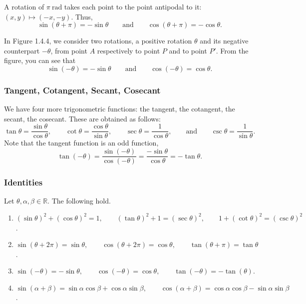 \documentclass[11pt]{book}
\theoremstyle{break}
\theoremstyle{no_label}
\newcommand{\bbR}{\mathbb{R}}
\numberwithin{equation}{section}
\begin{document}
\vspace*{1.5em}

A rotation of $\pi\ \text{rad}$ takes each point to the point antipodal to it: $(x, y)\mapsto(-x, -y)$. Thus, $$\sin(\theta+\pi)=-\sin\theta\qquad\text{and}\qquad\cos(\theta+\pi)=-\cos\theta.$$

In Figure 1.4.4, we consider two rotations, a positive rotation $\theta$ and its negative counterpart $-\theta$, from point $A$ respectively to point $P$ and to point $P'$. From the figure, you can see that $$\sin(-\theta)=-\sin\theta\qquad\text{and}\qquad\cos(-\theta)=\cos\theta.$$

\subsubsection*{Tangent, Cotangent, Secant, Cosecant}

We have four more trigonometric functions: the tangent, the cotangent, the secant, the cosecant. These are obtained as follows: $$\tan\theta=\dfrac{\sin\theta}{\cos\theta},\qquad\cot\theta=\dfrac{\cos\theta}{\sin\theta},\qquad\sec\theta=\dfrac{1}{\cos\theta},\qquad\text{and}\qquad\csc\theta=\dfrac{1}{\sin\theta}.$$ Note that the tangent function is an odd function, $$\tan(-\theta)=\dfrac{\sin(-\theta)}{\cos(-\theta)}=\dfrac{-\sin\theta}{\cos\theta}=-\tan\theta.$$

\subsubsection*{Identities}

\begin{theorem}
    Let $\theta, \alpha, \beta\in\bbR$. The following hold.
    \begin{enumerate}
        \item $(\sin\theta)^2+(\cos\theta)^2=1, \qquad (\tan\theta)^2+1=(\sec\theta)^2,\qquad 1+(\cot\theta)^2=(\csc\theta)^2$.
        \item $\sin(\theta+2\pi)=\sin\theta,\qquad\cos(\theta+2\pi)=\cos\theta,\qquad\tan(\theta+\pi)=\tan\theta$.
        \item $\sin(-\theta)=-\sin\theta,\qquad\cos(-\theta)=\cos\theta,\qquad\tan(-\theta)=-\tan(\theta)$.
        \item $\sin(\alpha+\beta)=\sin\alpha\cos\beta+\cos\alpha\sin\beta,\qquad\cos(\alpha+\beta)=\cos\alpha\cos\beta-\sin\alpha\sin\beta$.
    \end{enumerate}
\end{theorem}
\end{document}
